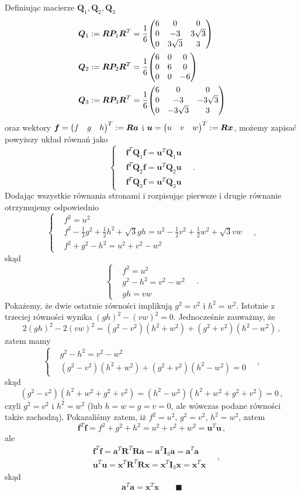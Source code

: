 \documentclass{myclass}
\begin{document}
Definiując macierze \(\bm{Q}_1,\bm{Q}_2,\bm{Q}_3\) 
\[
\begin{split}
&\bm{Q}_1 := \bm{R}\bm{P}_1\bm{R}^T = \frac{1}{6}\mqty(6&0&0\\0&-3&3\sqrt{3}\\0&3\sqrt{3}&3)\\
&\bm{Q}_2 := \bm{R}\bm{P}_2\bm{R}^T = \frac{1}{6}\mqty(6&0&0\\0&6&0\\0&0&-6)\\
&\bm{Q}_3 := \bm{R}\bm{P}_3\bm{R}^T = \frac{1}{6}\mqty(6&0&0\\0&-3&-3\sqrt{3}\\0&-3\sqrt{3}&3)
\end{split}
\]
oraz wektory \(\bm{f} = \mqty(f&g&h)^T := \bm{Ra}\) i \(\bm{u} = \mqty(u&v&w)^T := \bm{Rx}\), możemy
zapisać powyższy układ równań jako
\[
\begin{cases}
&\bm{f}^T\bm{Q}_1\bm{f} = \bm{u}^T\bm{Q}_1\bm{u}\\
&\bm{f}^T\bm{Q}_2\bm{f} = \bm{u}^T\bm{Q}_2\bm{u}\\
&\bm{f}^T\bm{Q}_3\bm{f} = \bm{u}^T\bm{Q}_3\bm{u}
\end{cases}\quad.
\]
Dodając wszystkie równania stronami i rozpisując pierwsze i drugie równanie otrzymujemy odpowiednio
\[
\begin{cases}
&f^2 = u^2\\
&f^2-\frac{1}{2}g^2 + \frac{1}{2}h^2 + \sqrt{3}gh = u^2-\frac{1}{2}v^2 + \frac{1}{2}w^2 + \sqrt{3}vw\\
&f^2 + g^2 - h^2 = u^2 + v^2 - w^2
\end{cases}\quad,
\]
skąd
\[
\begin{cases}
&f^2 = u^2\\
&g^2 - h^2 = v^2 - w^2\\
&gh = vw
\end{cases}\quad.
\]
Pokażemy, że dwie ostatnie równości implikują \(g^2 = v^2\) i \(h^2 = w^2\). Istotnie z trzeciej
równości wynika \((gh)^2 - (vw)^2 = 0\). Jednocześnie zauważmy, że
\[
2(gh)^2 - 2(vw)^2 = (g^2 - v^2)(h^2 + w^2) + (g^2 + v^2)(h^2 - w^2)\,,
\]
zatem mamy
\[
\begin{cases}
&g^2 - h^2 = v^2 - w^2\\
&(g^2 - v^2)(h^2 + w^2) + (g^2 + v^2)(h^2 - w^2) = 0
\end{cases}\quad,
\]
skąd
\[
(g^2 - v^2)(h^2 +w^2 + g^2 + v^2) = (h^2 - w^2)(h^2 +w^2 + g^2 + v^2) = 0\,,
\]
czyli \(g^2 = v^2\) i \(h^2 = w^2\) (lub \(h=w=g=v=0\), ale wówczas podane równości także zachodzą).
Pokazaliśmy zatem, iż \(f^2 = u^2\), \(g^2 = v^2\), \(h^2 = w^2\), zatem
\[
\bm{f}^T\bm{f} = f^2 + g^2 + h^2 = u^2 + v^2 + w^2 = \bm{u}^T\bm{u}\,,
\]
ale 
\[
\begin{split}
&\bm{f}^T\bm{f} = \bm{a}^T\bm{R}^T\bm{R}\bm{a} = \bm{a}^T\bm{I}_3\bm{a} = \bm{a}^T\bm{a}\\
&\bm{u}^T\bm{u} = \bm{x}^T\bm{R}^T\bm{R}\bm{x} = \bm{x}^T\bm{I}_3\bm{x} = \bm{x}^T\bm{x}   
\end{split}\quad,
\]
skąd
\[
\bm{a}^T\bm{a} = \bm{x}^T\bm{x}\quad\quad\blacksquare
\]
\end{document}
